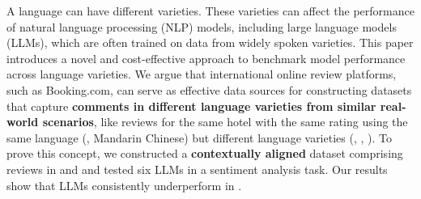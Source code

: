 A language can have different varieties. 
These varieties can affect the performance of natural language processing (NLP) models, including large language models (LLMs), which are often trained on data from widely spoken varieties.
This paper introduces a novel and cost-effective approach to benchmark model performance across language varieties.
We argue that international online review platforms, such as Booking.com, can serve as effective data sources for constructing datasets that capture \textbf{comments in different language varieties from similar real-world scenarios}, like reviews for the same hotel with the same rating using the same language (\eg, Mandarin Chinese) but different language varieties (\eg, \twChinese, \cnChinese).  
To prove this concept, we constructed a \textbf{contextually aligned} dataset comprising reviews in \twChinese and \cnChinese and tested six LLMs in a sentiment analysis task. 
Our results show that LLMs consistently underperform in \twChinese. %